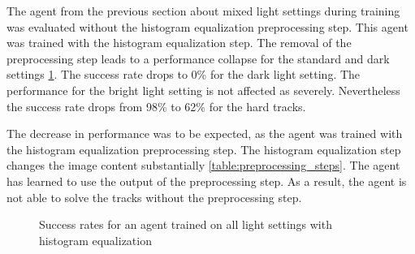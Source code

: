 The agent from the previous section about mixed light settings during training was evaluated without the histogram equalization preprocessing step. This agent was trained with the histogram equalization step. The removal of the preprocessing step leads to a performance collapse for the standard and dark settings \ref{fig:hardDistance_mixedLight_comparison_withWithoutHistogramEqualization}. The success rate drops to 0\% for the dark light setting.
The performance for the bright light setting is not affected as severely. Nevertheless the success rate drops from 98\% to 62\% for the hard tracks.

The decrease in performance was to be expected, as the agent was trained with the histogram equalization preprocessing step. The histogram equalization step changes the image content substantially \ref{table:preprocessing_steps}. The agent has learned to use the output of the preprocessing step. As a result, the agent is not able to solve the tracks without the preprocessing step.

\begin{figure}
    \centering
    \caption{Success rates for an agent trained on all light settings with histogram equalization}
    \label{fig:hardDistance_mixedLight_comparison_withWithoutHistogramEqualization}
\end{figure}


